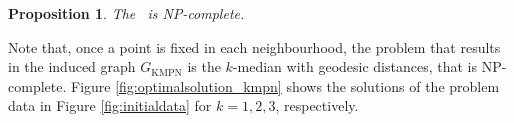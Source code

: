 \documentclass[a4paper,  review, authoryear, 1p.]{elsarticle}
\newcommand{\KMPN}{{\sf{H-KMPN}}}
\newcommand{\GKMPN}{{G_{\text{KMPN}}}}
\newtheorem{prop}{Proposition}
\begin{document}

%

\begin{prop}
	The \KMPN \ is NP-complete.
\end{prop}

Note that, once a point is fixed in each neighbourhood, the problem that results in the induced graph $\GKMPN$ is the $k$-median with geodesic distances, that is NP-complete. Figure \ref{fig:optimalsolution_kmpn} shows the solutions of the problem data in Figure \ref{fig:initialdata} for $k=1,2,3$, respectively.
\end{document}
